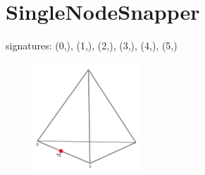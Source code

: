 \documentclass{article}
\begin{document}
\setcounter{subfigure}{0}
\clearpage

\section{SingleNodeSnapper}

signatures: (0,), (1,), (2,), (3,), (4,), (5,)

\begin{figure}[h!]
\includegraphics[width=4cm]{SingleNodeSnapper}
\end{figure}

\begin{figure}[h!]
\end{figure}
\end{document}
